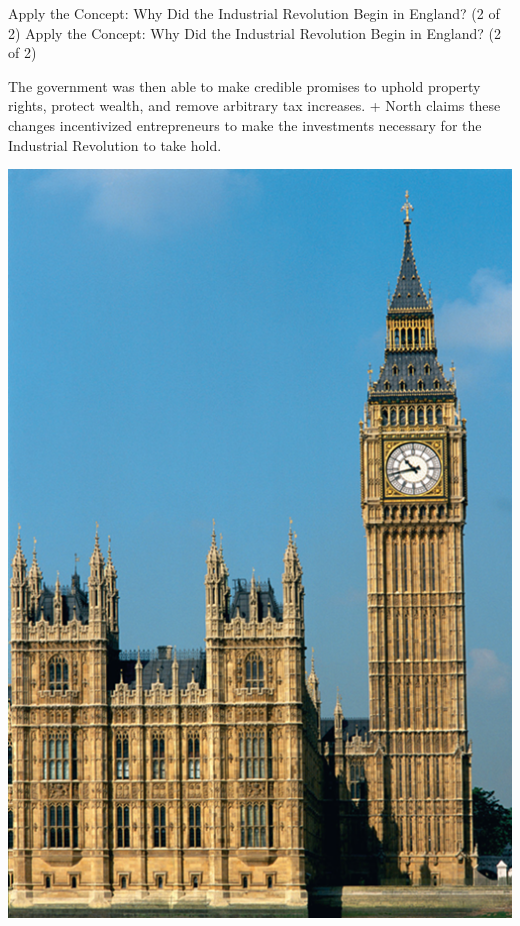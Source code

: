 \documentclass[
  12pt,
  ignorenonframetext,
]{beamer}
\begin{document}
\begin{frame}{Apply the Concept: Why Did the Industrial Revolution Begin
in England? (2 of 2)}
\protect\hypertarget{apply-the-concept-why-did-the-industrial-revolution-begin-in-england-2-of-2}{}
Apply the Concept: Why Did the Industrial Revolution Begin in England?
(2 of 2)

The government was then able to make credible promises to uphold
property rights, protect wealth, and remove arbitrary tax increases. +
North claims these changes incentivized entrepreneurs to make the
investments necessary for the Industrial Revolution to take hold.

\includegraphics[width=\textwidth,height=0.99\textheight]{imgs3/img_slide10a.png}
\end{frame}
\end{document}
